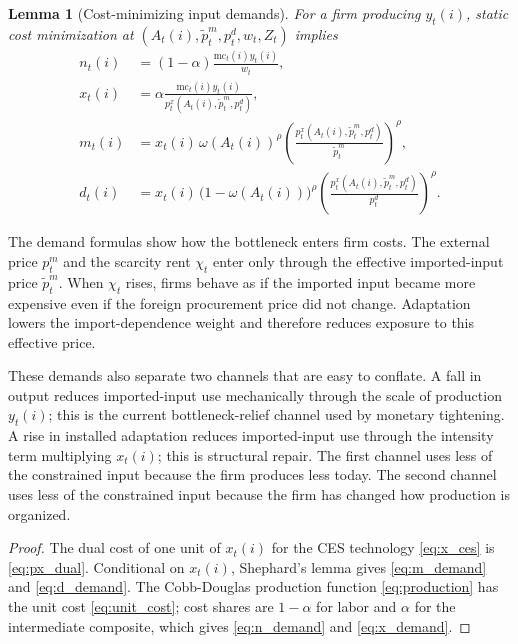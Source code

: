 ﻿\documentclass[12pt]{article}
\newtheorem{lemma}{Lemma}
\theoremstyle{remark}
\newcommand{\mc}{\mathrm{mc}}
\begin{document}
\begin{lemma}[Cost-minimizing input demands]\label{lem:input_demands}
For a firm producing $y_t(i)$, static cost minimization at
$(A_t(i),\tilde p_t^m,p_t^d,w_t,Z_t)$ implies
\begin{align}
    n_t(i)
    &=
    (1-\alpha)\frac{\mc_t(i)y_t(i)}{w_t},
    \label{eq:n_demand}\\
    x_t(i)
    &=
    \alpha\frac{\mc_t(i)y_t(i)}{p_t^x(A_t(i),\tilde p_t^m,p_t^d)},
    \label{eq:x_demand}\\
    m_t(i)
    &=
    x_t(i)\,
    \omega(A_t(i))^\rho
    \left(
        \frac{p_t^x(A_t(i),\tilde p_t^m,p_t^d)}{\tilde p_t^m}
    \right)^\rho,
    \label{eq:m_demand}\\
    d_t(i)
    &=
    x_t(i)\,
    \bigl(1-\omega(A_t(i))\bigr)^\rho
    \left(
        \frac{p_t^x(A_t(i),\tilde p_t^m,p_t^d)}{p_t^d}
    \right)^\rho.
    \label{eq:d_demand}
\end{align}
\end{lemma}

The demand formulas show how the bottleneck enters firm costs. The external price $p_t^m$ and the
scarcity rent $\chi_t$ enter only through the effective imported-input price
$\tilde p_t^m$. When $\chi_t$ rises, firms behave as if the imported input became more expensive
even if the foreign procurement price did not change. Adaptation lowers the import-dependence
weight and therefore reduces exposure to this effective price.

These demands also separate two channels that are easy to conflate. A fall in output reduces
imported-input use mechanically through the scale of production $y_t(i)$; this is the current
bottleneck-relief channel used by monetary tightening. A rise in installed adaptation reduces
imported-input use through the intensity term multiplying $x_t(i)$; this is structural repair.
The first channel uses less of the constrained input because the firm produces less today. The
second channel uses less of the constrained input because the firm has changed how production is
organized.

\begin{proof}
The dual cost of one unit of $x_t(i)$ for the CES technology \eqref{eq:x_ces} is
\eqref{eq:px_dual}. Conditional on $x_t(i)$, Shephard's lemma gives
\eqref{eq:m_demand} and \eqref{eq:d_demand}. The Cobb-Douglas production function
\eqref{eq:production} has the unit cost \eqref{eq:unit_cost}; cost shares are $1-\alpha$ for labor
and $\alpha$ for the intermediate composite, which gives \eqref{eq:n_demand} and
\eqref{eq:x_demand}.
\end{proof}
\end{document}
